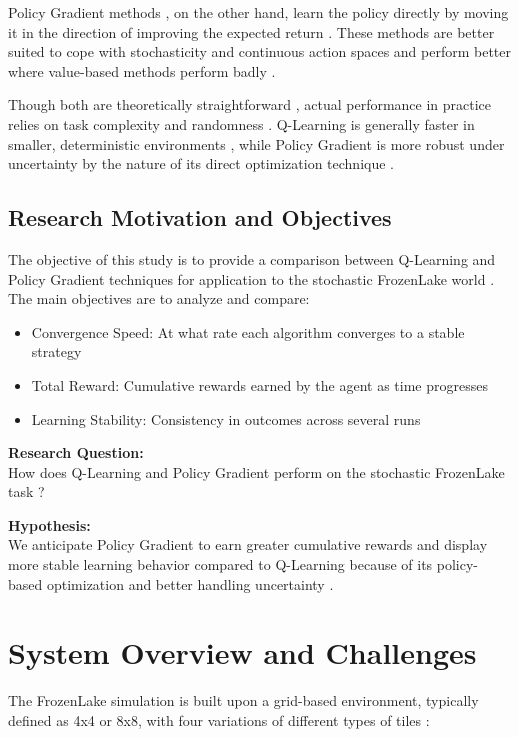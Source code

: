 \documentclass[conference]{IEEEtran}
\begin{document}
Policy Gradient methods \cite{Williams1992}, on the other hand, learn the policy directly by moving it in the direction of improving the expected return \cite{Sutton2000}. These methods are better suited to cope with stochasticity and continuous action spaces and perform better where value-based methods perform badly \cite{Kakade2002}.

Though both are theoretically straightforward \cite{SuttonBarto2018}, actual performance in practice relies on task complexity and randomness \cite{Hafner2023}. Q-Learning is generally faster in smaller, deterministic environments \cite{Watkins1992}, while Policy Gradient is more robust under uncertainty by the nature of its direct optimization technique \cite{Schulman2015}.

\subsection{Research Motivation and Objectives}
The objective of this study is to provide a comparison between Q-Learning \cite{Watkins1992} and Policy Gradient techniques \cite{Williams1992} for application to the stochastic FrozenLake world \cite{Brockman2016}. The main objectives are to analyze and compare:

\begin{itemize}
\item Convergence Speed: At what rate each algorithm converges to a stable strategy \cite{Henderson2018}
\item Total Reward: Cumulative rewards earned by the agent as time progresses \cite{Mnih2015}
\item Learning Stability: Consistency in outcomes across several runs \cite{Thomas2016}
\end{itemize}

\textbf{Research Question:}\\
How does Q-Learning \cite{Watkins1992} and Policy Gradient \cite{Williams1992} perform on the stochastic FrozenLake task \cite{Brockman2016}?

\textbf{Hypothesis:}\\
We anticipate Policy Gradient \cite{Williams1992} to earn greater cumulative rewards and display more stable learning behavior compared to Q-Learning \cite{Watkins1992} because of its policy-based optimization and better handling uncertainty \cite{Schulman2015}.

\section{System Overview and Challenges}
The FrozenLake simulation \cite{Brockman2016} is built upon a grid-based environment, typically defined as 4x4 or 8x8, with four variations of different types of tiles \cite{SuttonBarto2018}:
\end{document}
